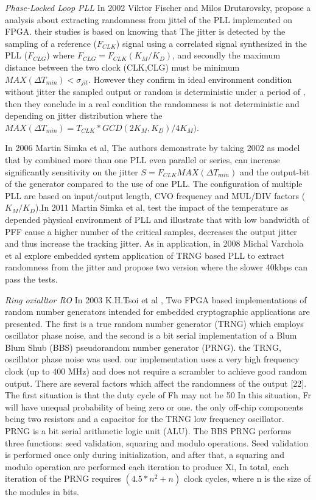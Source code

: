 \textit{Phase-Locked Loop PLL}
In 2002 Viktor Fischer and Milos Drutarovsky, propose a analysis about extracting randomness from jittel of the PLL implemented on FPGA. their studies is based on knowing that The jitter is detected by the sampling of a reference ($F_{CLK}$) signal using a correlated signal synthesized in the PLL ($F_{CLG}$) where $F_{CLG}=F_{CLK}(K_{M}/K_{D})$, and secondly the maximum distance between the two clock (CLK,CLG) must be minimum $MAX(\Delta T_{min})< \sigma_{jit}$. However they confirm in ideal environment condition without jitter the sampled output or random is deterministic under a period of , then they conclude in a real condition  the randomness is not deterministic and depending on jitter distribution where the $MAX(\Delta T_{min})= {T_{CLK}*GCD(2K_{M},K_{D})}/{4K_{M}})$.  

In 2006 Martin Simka et al, The authors demonstrate by taking 2002 as model that by combined more than one PLL even parallel or series, can increase significantly sensitivity on the jitter $S=F_{CLK}MAX(\Delta T_{min})$ and the output-bit of the generator compared to the use of one PLL. The configuration of multiple PLL are based on input/output length, CVO frequency and MUL/DIV factors ($K_{M}/K_{D}$).In 2011 Martin Simka et al, test the impact of the temperature as depended physical environment of PLL and illustrate that with low bandwidth of PFF cause a higher number of the critical samples, decreases the output jitter and thus increase the tracking jitter. As in application, in 2008 Michal Varchola et al explore embedded system application of TRNG based PLL to extract randomness from the jitter and propose two version where the slower 40kbps can pass the tests.

\textit{Ring oxialltor RO}
In 2003 K.H.Tsoi et al , Two FPGA based implementations of random number generators intended for embedded cryptographic applications are presented. The first is a true random number generator (TRNG) which employs oscillator phase noise, and the second is a bit serial implementation of a Blum Blum Shub (BBS) pseudorandom number generator (PRNG). the TRNG, oscillator phase noise was used. our implementation uses a very high frequency clock (up to 400 MHz) and does not require a scrambler to achieve good random output. There are several factors which affect the randomness of the output [22]. The first situation is that the duty cycle of Fh may not be 50%
In this situation, Fr will have unequal probability of being zero or one. the only off-chip components being two resistors and a capacitor for the TRNG low frequency oscillator. PRNG is a bit serial arithmetic logic unit (ALU). The BBS PRNG performs three functions: seed validation, squaring and modulo operations. Seed validation is
performed once only during initialization, and after that, a squaring and modulo operation are performed each iteration to produce Xi, In total, each iteration of the PRNG requires $(4.5*n^{2} + n)$ clock cycles, where n is the size of the modules in bits.

